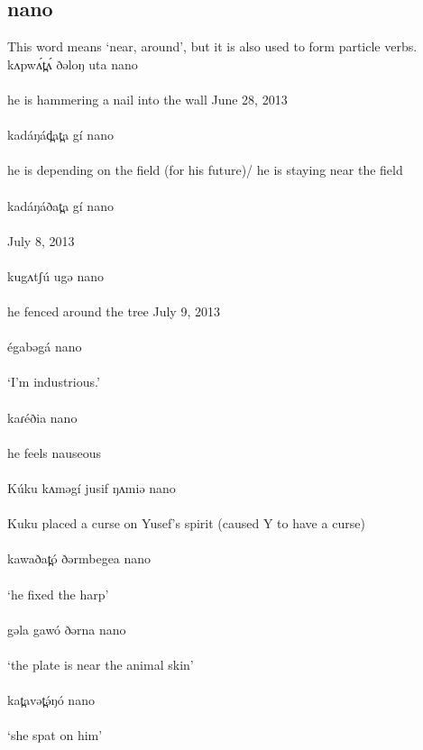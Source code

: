 \subsection{nano}
This word means ‘near, around’, but it is also used to form particle verbs.
\\
\gll kʌpwʌ́t̪ʌ́ ðəloŋ uta nano\\
\\
\trans he is hammering a nail into the wall \hfill June 28, 2013\\
\\
\gll kadáŋád̪at̪a gí nano\\
\\
\trans	he is depending on the field (for his future)/ he is staying near the field\\
\\
\gll kadáŋáðat̪a gí nano\\
\\
\trans \hfill	July 8, 2013\\
\\
\gll kugʌtʃú ugə nano\\
\\
\trans	he fenced around the tree	\hfill July 9, 2013\\
\\
\gll égabəgá nano\\
\\
\trans	‘I’m industrious.’\\
\\
\gll kaɾéðia nano\\
\\
\trans	he feels nauseous\\
\\
\gll Kúku kʌməgí jusif ŋʌmiə nano\\
\\
\trans	Kuku placed a curse on Yusef’s spirit (caused Y to have a curse)\\
\\
\gll kawaðat̪ó ðərmbegea nano\\
\\
\trans	‘he fixed the harp’\\
\\
\gll gəla gawó ðərna nano\\
\\
\trans	‘the plate is near the animal skin’\\
\\
\gll kat̪avət̪ə́ŋó nano\\
\\
\trans	‘she spat on him’\\

